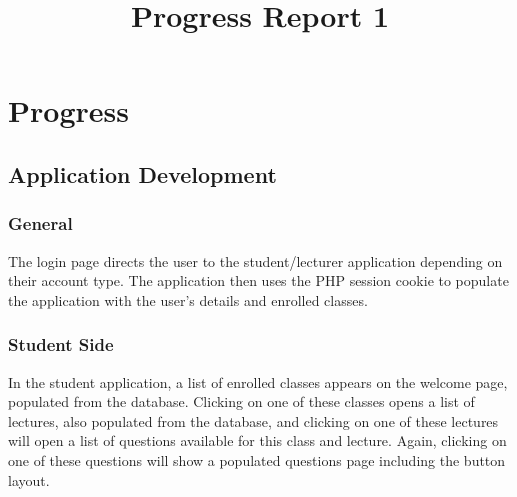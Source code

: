 \documentclass{article}
\title{
\textmd{\textbf{Progress Report 1}}\\
}
\author{\textbf{\hmwkAuthorName}}
\begin{document}
\newpage

\section{Progress}
\subsection{Application Development}
\subsubsection{General}
The login page directs the user to the student/lecturer application depending on their account type. The application then uses the PHP session cookie to populate the application with the user's details and enrolled classes.

\subsubsection{Student Side}
In the student application, a list of enrolled classes appears on the welcome page, populated from the database. Clicking on one of these classes opens a list of lectures, also populated from the database, and clicking on one of these lectures will open a list of questions available for this class and lecture. Again, clicking on one of these questions will show a populated questions page including the button layout.
\end{document}
